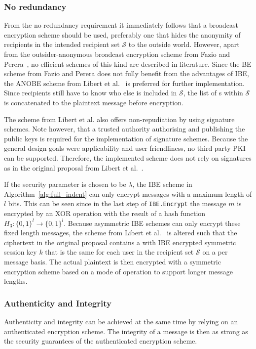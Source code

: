 \subsubsection{No redundancy}
From the no redundancy requirement it immediately follows that a broadcast encryption scheme should be used, preferably one that hides the anonymity of recipients in the intended recipient set $\mathcal{S}$ to the outside world. However, apart from the outsider-anonymous broadcast encryption scheme from Fazio and Perera~\cite{art:FazioP12}, no efficient schemes of this kind are described in literature. Since the BE scheme from Fazio and Perera does not fully benefit from the advantages of IBE, the ANOBE scheme from Libert et al.~\cite{art:LibertPQ12} is preferred for further implementation. Since recipients still have to know who else is included in $\mathcal{S}$, the list of \id{}s within $\mathcal{S}$ is concatenated to the plaintext message before encryption.

The scheme from Libert et al. also offers non-repudiation by using signature schemes. Note however, that a trusted authority authorising and publishing the public keys is required for the implementation of signature schemes. Because the general design goals were applicability and user friendliness, no third party PKI can be supported. Therefore, the implemented scheme does not rely on signatures as in the original proposal from Libert et al.~\cite{art:LibertPQ12}.

If the security parameter is chosen to be $\lambda$, the IBE scheme in Algorithm~\ref{alg:full_indent} can only encrypt messages with a maximum length of $l$ bits. This can be seen since in the last step of \texttt{IBE.Encrypt} the message $m$ is encrypted by an XOR operation with the result of a hash function $H_3: \{ 0,1 \}^l \rightarrow \{ 0,1 \}^l$. Because asymmetric IBE schemes can only encrypt these fixed length messages, the scheme from Libert et al.~\cite{art:LibertPQ12} is altered such that the ciphertext in the original proposal contains a with IBE encrypted symmetric session key $k$ that is the same for each user in the recipient set $\mathcal{S}$ on a per message basis. The actual plaintext is then encrypted with a symmetric encryption scheme based on a mode of operation to support longer message lengths.

\subsubsection{Authenticity and Integrity}
\label{sec:authenticity_and_integrity}
Authenticity and integrity can be achieved at the same time by relying on an authenticated encryption scheme. The integrity of a message is then as strong as the security guarantees of the authenticated encryption scheme. 

